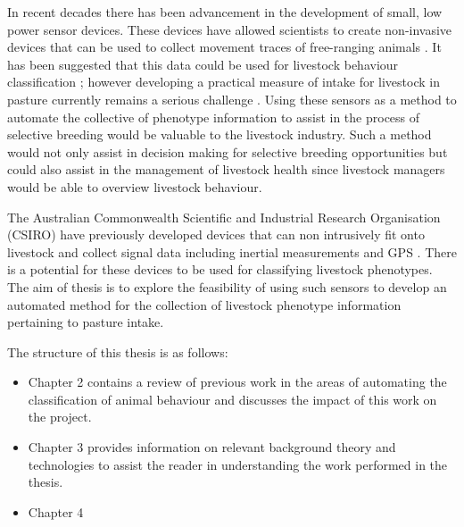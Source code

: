 In recent decades there has been advancement in the development of small, low power sensor devices. These devices have allowed scientists to create non-invasive devices that can be used to collect movement traces of free-ranging animals \cite{Anthony2012}. It has been suggested that this data could be used for livestock behaviour classification \cite{Guo2006}; however developing a practical measure of intake for livestock in pasture currently remains a serious challenge \cite{Cottle2013}. Using these sensors as a method to automate the collective of phenotype information to assist in the process of selective breeding would be valuable to the livestock industry. Such a method would not only assist in decision making for selective breeding opportunities but could also assist in the management of livestock health since livestock managers would be able to overview livestock behaviour. 

The Australian Commonwealth Scientific and Industrial Research Organisation (CSIRO) have previously developed devices that can non intrusively fit onto livestock and collect signal data including inertial measurements and GPS \cite{Guo2006}. There is a potential for these devices to be used for classifying livestock phenotypes. The aim of thesis is to explore the feasibility of using such sensors to develop an automated method for the collection of livestock phenotype information pertaining to pasture intake. 

The structure of this thesis is as follows:

\begin{itemize}
\item Chapter 2 contains a review of previous work in the areas of automating the classification of animal behaviour and discusses the impact of this work on the project. 

\item Chapter 3 provides information on relevant background theory and technologies to assist the reader in understanding the work performed in the thesis.

\item Chapter 4

\end{itemize}
